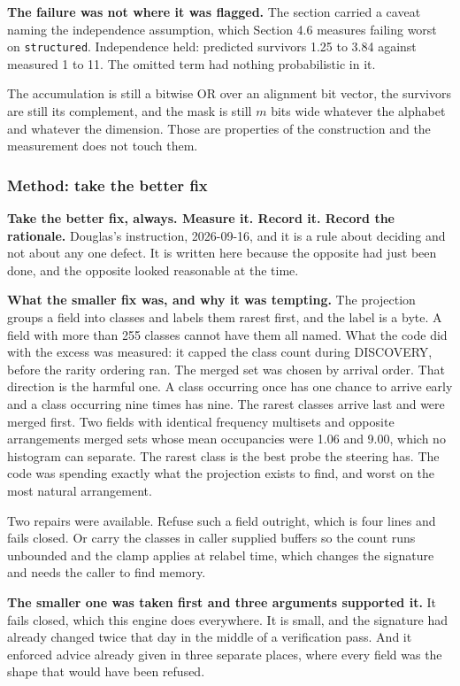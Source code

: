 \textbf{The failure was not where it was flagged.} The section carried a caveat naming the independence assumption, which Section 4.6 measures failing worst on \texttt{structured}. Independence held: predicted survivors 1.25 to 3.84 against measured 1 to 11. The omitted term had nothing probabilistic in it.

The accumulation is still a bitwise OR over an alignment bit vector, the survivors are still its complement, and the mask is still \(m\) bits wide whatever the alphabet and whatever the dimension. Those are properties of the construction and the measurement does not touch them.

\subsubsection{Method: take the better fix}

\textbf{Take the better fix, always. Measure it. Record it. Record the rationale.} Douglas's instruction, 2026-09-16, and it is a rule about deciding and not about any one defect. It is written here because the opposite had just been done, and the opposite looked reasonable at the time.

\textbf{What the smaller fix was, and why it was tempting.} The projection groups a field into classes and labels them rarest first, and the label is a byte. A field with more than 255 classes cannot have them all named. What the code did with the excess was measured: it capped the class count during DISCOVERY, before the rarity ordering ran. The merged set was chosen by arrival order. That direction is the harmful one. A class occurring once has one chance to arrive early and a class occurring nine times has nine. The rarest classes arrive last and were merged first. Two fields with identical frequency multisets and opposite arrangements merged sets whose mean occupancies were 1.06 and 9.00, which no histogram can separate. The rarest class is the best probe the steering has. The code was spending exactly what the projection exists to find, and worst on the most natural arrangement.

Two repairs were available. Refuse such a field outright, which is four lines and fails closed. Or carry the classes in caller supplied buffers so the count runs unbounded and the clamp applies at relabel time, which changes the signature and needs the caller to find memory.

\textbf{The smaller one was taken first and three arguments supported it.} It fails closed, which this engine does everywhere. It is small, and the signature had already changed twice that day in the middle of a verification pass. And it enforced advice already given in three separate places, where every field was the shape that would have been refused.

